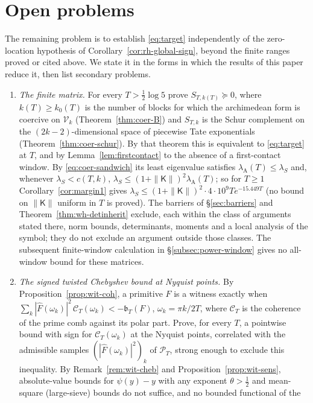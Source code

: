 \documentclass[11pt]{amsart}
\theoremstyle{definition}
\theoremstyle{remark}
\newcommand{\PT}{\mathcal P_T}
\newcommand{\lamA}{\lambda_{\mathrm A}(T)}
\newcommand{\Fh}{\widehat F}
\begin{document}
\section{Open problems}\label{sec:open}

The remaining problem is to establish \eqref{eq:target} independently of the zero-location hypothesis of Corollary~\ref{cor:rh-global-sign}, beyond the finite ranges proved or cited above. We state it in the forms in which the results of
this paper reduce it, then list secondary problems.

\begin{enumerate}
\item[(L2)] \emph{The finite matrix.} For every $T>\frac12\log5$ prove $S_{T,k(T)}\succeq0$, where $k(T)\ge k_0(T)$ is
the number of blocks for which the archimedean form is coercive on $\mathcal V_k$ (Theorem~\ref{thm:coer-B}) and
$S_{T,k}$ is the Schur complement on the $(2k-2)$-dimensional space of piecewise Tate exponentials
(Theorem~\ref{thm:coer-schur}). By that theorem this is equivalent to \eqref{eq:target} at $T$, and by
Lemma~\ref{lem:firstcontact} to the absence of a first-contact window. By \eqref{eq:coer-sandwich} its least
eigenvalue satisfies $\lamA\le\lambda_S$ and, whenever $\lambda_S<c(T,k)$, $\lambda_S\le(1+\|\mathsf K\|)^2\lamA$; so for
$T\ge1$ Corollary~\ref{cor:margin1} gives $\lambda_S\le(1+\|\mathsf K\|)^2\cdot4\cdot10^9Te^{-15.449T}$ (no bound on
$\|\mathsf K\|$ uniform in $T$ is proved). The barriers of \S\ref{sec:barriers} and
Theorem~\ref{thm:wh-detinherit} exclude, each within the class of arguments stated there, norm bounds,
determinants, moments and a local analysis of the symbol; they do not exclude an argument outside those
classes. The subsequent finite-window calculation in \S\ref{subsec:power-window} gives no all-window bound for these matrices.
\item[(N)] \emph{The signed twisted Chebyshev bound at Nyquist points.} By Proposition~\ref{prop:wit-coh}, a
primitive $F$ is a witness exactly when $\sum_k|\Fh(\omega_k)|^2\,\mathcal C_T(\omega_k)<-\mathfrak b_T(F)$,
$\omega_k=\pi k/2T$, where $\mathcal C_T$ is the coherence of the prime comb against its polar part. Prove, for
every $T$, a pointwise bound with sign for $\mathcal C_T(\omega_k)$ at the Nyquist points, correlated with the
admissible samples $(|\Fh(\omega_k)|^2)_k$ of $\PT$, strong enough to exclude this inequality. By
Remark~\ref{rem:wit-cheb} and Proposition~\ref{prop:wit-sens}, absolute-value bounds for $\psi(y)-y$ with any
exponent $\theta>\frac12$ and mean-square (large-sieve) bounds do not suffice, and no bounded functional of the

\end{enumerate}
\end{document}
